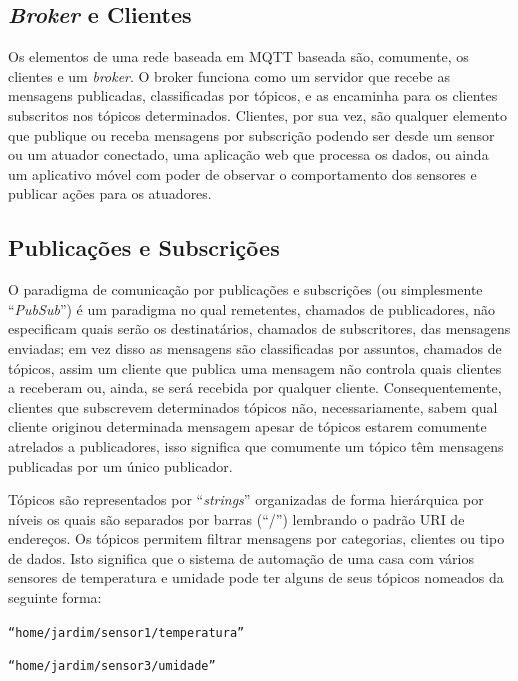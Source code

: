 \subsection{\textit{Broker} e Clientes}

Os elementos de uma rede baseada em MQTT baseada são, comumente, os clientes e um \textit{broker}. O broker funciona como um servidor que recebe as mensagens publicadas, classificadas por tópicos, e as encaminha para os clientes subscritos nos tópicos determinados. Clientes, por sua vez, são qualquer elemento que publique ou receba mensagens por subscrição podendo ser desde um sensor ou um atuador conectado, uma aplicação web que processa os dados, ou ainda um aplicativo móvel com poder de observar o comportamento dos sensores e publicar ações para os atuadores.

\subsection{Publicações e Subscrições}

O paradigma de comunicação por publicações e subscrições (ou simplesmente “\textit{PubSub}”) é um paradigma no qual remetentes, chamados de publicadores, não especificam quais serão os destinatários, chamados de subscritores, das mensagens enviadas; em vez disso as mensagens são classificadas por assuntos, chamados de tópicos, assim um cliente que publica uma mensagem não controla quais clientes a receberam ou, ainda, se será recebida por qualquer cliente. Consequentemente, clientes que subscrevem determinados tópicos não, necessariamente, sabem qual cliente originou determinada mensagem apesar de tópicos estarem comumente atrelados a publicadores, isso significa que comumente um tópico têm mensagens publicadas por um único publicador.

Tópicos são representados por “\textit{strings}” organizadas de forma hierárquica por níveis os quais são separados por barras (“/”) lembrando o padrão URI de endereços. Os tópicos permitem filtrar mensagens por categorias, clientes ou tipo de dados. Isto significa que o sistema de automação de uma casa com vários sensores de temperatura e umidade pode ter alguns de seus tópicos nomeados da seguinte forma:

\begin{center}
    \texttt{“home/jardim/sensor1/temperatura”}
    
    \texttt{“home/jardim/sensor3/umidade”}
\end{center}

